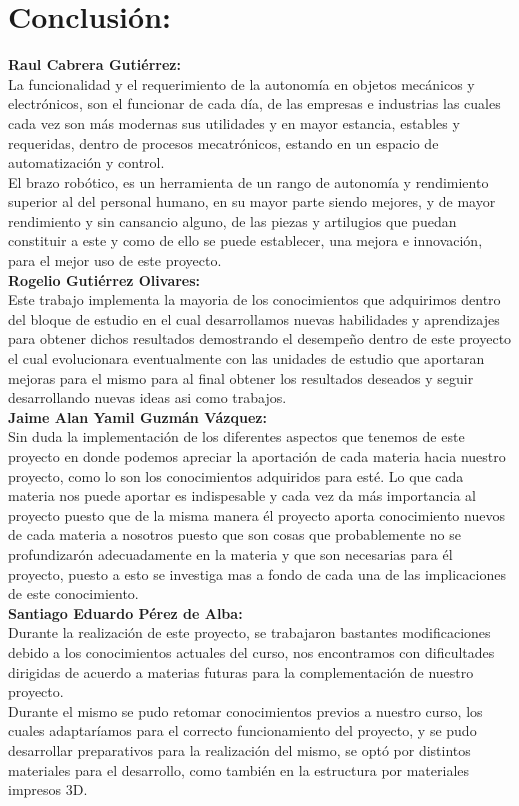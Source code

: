 \documentclass[14pt,a4paper]{article}
\begin{document}
\section{Conclusión:}
\textbf{Raul Cabrera Gutiérrez:}\\
La funcionalidad y el requerimiento de la autonomía en objetos mecánicos y electrónicos, son el funcionar de cada día, de las empresas e industrias las cuales cada vez son más modernas sus utilidades y en mayor estancia, estables y requeridas, dentro de procesos mecatrónicos, estando en un espacio de automatización y control.\\
El brazo robótico, es un herramienta de un rango de autonomía y rendimiento superior al del personal humano, en su mayor parte siendo mejores, y de mayor rendimiento y sin cansancio alguno, de las piezas y artilugios que puedan constituir a este y como de ello se puede establecer, una mejora e innovación, para el mejor uso de este proyecto.\\

\textbf{Rogelio Gutiérrez Olivares:}\\
Este trabajo implementa la mayoria de los conocimientos que adquirimos dentro del bloque de estudio en el cual desarrollamos nuevas habilidades y aprendizajes para obtener dichos resultados demostrando el desempeño dentro de este proyecto el cual evolucionara eventualmente con las unidades de estudio que aportaran mejoras para el mismo para al final obtener los resultados deseados y seguir desarrollando nuevas ideas asi como trabajos.\\

\textbf{Jaime Alan Yamil Guzmán Vázquez:}\\
Sin duda la implementación de los diferentes aspectos que tenemos de este proyecto en donde podemos apreciar la aportación de cada materia hacia nuestro proyecto, como lo son los conocimientos adquiridos para esté. Lo que cada materia nos puede aportar es indispesable y cada vez da más importancia al proyecto puesto que de la misma manera él proyecto aporta conocimiento nuevos de cada materia a nosotros puesto que son cosas que probablemente no se profundizarón adecuadamente en la materia y que son necesarias para él proyecto, puesto a esto se investiga mas a fondo de cada una de las implicaciones de este conocimiento.\\

\textbf{Santiago Eduardo Pérez de Alba:}\\
Durante la realización de este proyecto, se trabajaron bastantes modificaciones debido a los conocimientos actuales del curso, nos encontramos con dificultades dirigidas de acuerdo a materias futuras para la complementación de nuestro proyecto.\\
Durante el mismo se pudo retomar conocimientos previos a nuestro curso, los cuales adaptaríamos para el correcto funcionamiento del proyecto, y se pudo desarrollar preparativos para la realización del mismo, se optó por distintos materiales para el desarrollo, como también en la estructura por materiales impresos 3D.\\
\end{document}
